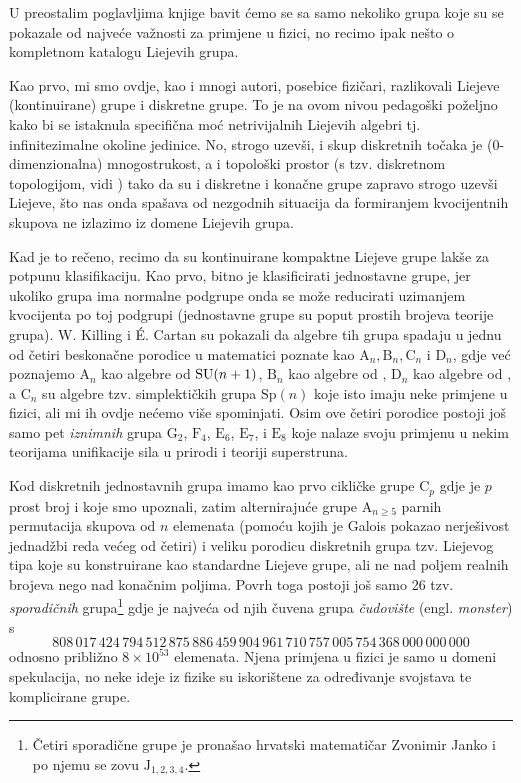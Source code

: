 U preostalim poglavljima knjige bavit ćemo se sa samo nekoliko grupa
koje su se pokazale od najveće važnosti za primjene u fizici, no recimo
ipak nešto o kompletnom katalogu Liejevih grupa.

Kao prvo, mi smo ovdje, kao i mnogi autori, posebice fizičari, razlikovali
Liejeve (kontinuirane) grupe i diskretne grupe. To je na ovom nivou pedagoški
poželjno kako bi se istaknula specifična moć netrivijalnih Liejevih algebri tj. infinitezimalne
okoline jedinice. No, strogo uzevši, i skup diskretnih točaka je
(0-dimenzionalna) mnogostrukost, a i topološki prostor (s tzv. 
diskretnom topologijom, vidi \cite{Smolic:2024}) tako da su i diskretne
i konačne grupe zapravo strogo uzevši Liejeve, što nas onda spašava od
nezgodnih situacija da formiranjem kvocijentnih skupova ne izlazimo
iz domene Liejevih grupa.

Kad je to rečeno, recimo da su kontinuirane kompaktne Liejeve grupe
lakše za potpunu klasifikaciju. Kao prvo,
bitno je klasificirati jednostavne grupe, jer ukoliko grupa ima normalne
podgrupe onda se može reducirati uzimanjem kvocijenta po toj podgrupi
(jednostavne grupe su poput prostih brojeva teorije grupa). W. Killing i \'{E}. Cartan
su pokazali da algebre tih grupa spadaju u jednu od četiri beskonačne 
porodice u matematici poznate kao $\mathrm{A}_n, \mathrm{B}_n, \mathrm{C}_n$
i $\mathrm{D}_n$, gdje već poznajemo
$\mathrm{A}_n$ kao algebre od $\mathrm{SU}(n+1)$,  $\mathrm{B}_n$ kao algebre od ,
$\mathrm{D}_n$ kao algebre od , a $\mathrm{C}_n$ su algebre tzv. simplektičkih grupa
$\mathrm{Sp}(n)$ koje isto imaju neke primjene u fizici, ali mi ih ovdje
nećemo više spominjati. Osim ove četiri porodice postoji još samo
pet \emph{iznimnih} grupa $\mathrm{G}_2$, $\mathrm{F}_4$,
$\mathrm{E}_6$, $\mathrm{E}_7$, i $\mathrm{E}_8$ koje nalaze svoju primjenu
u nekim teorijama unifikacije sila u prirodi i teoriji superstruna.

Kod diskretnih jednostavnih grupa imamo kao prvo cikličke grupe $\mathrm{C}_{p}$
gdje je $p$ prost broj i koje smo upoznali, 
zatim alternirajuće grupe $\mathrm{A}_{n\ge 5}$ parnih permutacija skupova
od $n$ elemenata (pomoću kojih je Galois pokazao nerješivost jednadžbi
reda većeg od četiri) i
veliku porodicu diskretnih grupa tzv. Liejevog tipa koje su konstruirane
kao standardne Liejeve grupe, ali ne nad poljem realnih brojeva nego
nad konačnim poljima. Povrh toga postoji još samo 26 tzv. \emph{sporadičnih}
grupa\footnote{Četiri sporadične grupe je pronašao hrvatski matematičar Zvonimir Janko
i po njemu se zovu $\mathrm{J}_{1, 2, 3, 4}$.} gdje je najveća od njih
čuvena grupa \emph{čudovište} (engl. \emph{monster}) s
\[ \textstyle
808\,017\,424\,794\,512\,875\,886\,459\,904\,961\,710\,757\,005\,754\,368\,000\,000\,000
\]
odnosno približno $8\times 10^{53}$ elemenata. Njena primjena u fizici je samo u domeni spekulacija, no
neke ideje iz fizike su iskorištene za određivanje svojstava te komplicirane
grupe.





